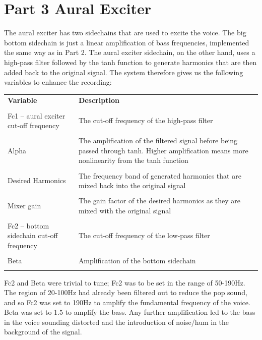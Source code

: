 \documentclass[12pt]{extarticle}
\begin{document}
\newpage
\section*{Part 3 Aural Exciter}

The aural exciter has two sidechains that are used to excite the voice. The big bottom sidechain is just a linear amplification of bass frequencies, implemented the same way as in Part 2. The aural exciter sidechain, on the other hand, uses a high-pass filter followed by the tanh function to generate harmonics that are then added back to the original signal. The system therefore gives us the following variables to enhance the recording:\\

\begin{center}
\begin{tabular}{ | m{7cm}| m{10cm} | } 
  \hline
  \textbf{Variable} & \textbf{Description} \\\\ 
  \hline
  Fc1 – aural exciter cut-off frequency & The cut-off frequency of the high-pass filter \\\\ 
  \hline
  Alpha & The amplification of the filtered signal before being passed through tanh. Higher amplification means more nonlinearity from the tanh function \\\\ 
  \hline
  Desired Harmonics & The frequency band of generated harmonics that are mixed back into the original signal \\\\
  \hline
  Mixer gain & The gain factor of the desired harmonics as they are mixed with the original signal \\\\
  \hline
  Fc2 – bottom sidechain cut-off frequency & The cut-off frequency of the low-pass filter \\\\
  \hline
  Beta & Amplification of the bottom sidechain \\\\
  \hline
\end{tabular}
\end{center}
Fc2 and Beta were trivial to tune; Fc2 was to be set in the range of 50-190Hz. The region of 20-100Hz had already been filtered out to reduce the pop sound, and so Fc2 was set to 190Hz to amplify the fundamental frequency of the voice. Beta was set to 1.5 to amplify the bass. Any further amplification led to the bass in the voice sounding distorted and the introduction of noise/hum in the background of the signal.\\\\
\end{document}
